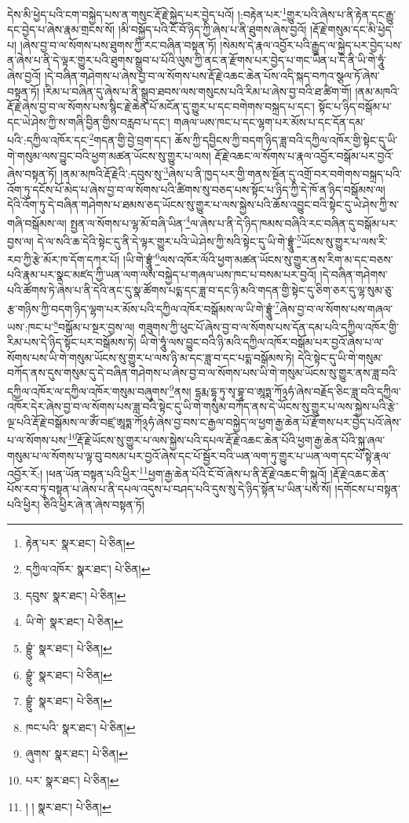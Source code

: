 དེས་མི་ཕྱེད་པའི་ངག་བསྐྱེད་པས་ན་གསུང་རྡོ་རྗེ་སྐྱེད་པར་བྱེད་པའོ། །:བརྟེན་པར་\footnote{རྟེན་པར་  སྣར་ཐང་།  པེ་ཅིན། }གྱུར་པའི་ཞེས་པ་ནི་རྟེན་དང་རྒྱུ་དང་བྱེད་པ་ཞེས་རྣམ་གྲངས་སོ། །མི་བསྐྱོད་པའི་ངོ་བོ་ཉིད་ཀྱི་ཞེས་པ་ནི་ཐུགས་ཞེས་བྱའོ། །རྡོ་རྗེ་གསུམ་དང་མི་ཕྱེད་པ། །ཞེས་བྱ་བ་ལ་སོགས་པས་ཐུགས་ཀྱི་རང་བཞིན་བསྟན་ཏོ། །སེམས་དེ་རྣལ་འབྱོར་པའི་རྒྱུད་ལ་སྐྱེད་པར་བྱེད་པས་ན་ཞེས་པ་ནི་དེ་ལྟར་གྱུར་པའི་ཐུགས་སྒྲུབ་པ་པོའི་ལུས་ཀྱི་ནང་ན་རྫོགས་པར་བྱེད་པ་གང་ཡིན་པ་དེ་ནི་ཡི་གེ་ཧཱུཾ་ཞེས་བྱའོ། །དེ་བཞིན་གཤེགས་པ་ཞེས་བྱ་བ་ལ་སོགས་པས་རྡོ་རྗེ་འཆང་ཆེན་པོས་འདི་སྐད་བཀའ་སྩལ་ཏོ་ཞེས་བསྟན་ཏོ། །རིམ་པ་བཞིན་དུ་ཞེས་པ་ནི་སྒྲུབ་ཐབས་ལས་གསུངས་པའི་རིམ་པ་ཞེས་བྱ་བའི་ཐ་ཚིག་གོ། །ནམ་མཁའི་རྡོ་རྗེ་ཞེས་བྱ་བ་ལ་སོགས་པས་སྙིང་རྗེ་ཆེན་པོ་མངོན་དུ་གྱུར་པ་དང་བགེགས་བསྐྲད་པ་དང་། སྟོང་པ་ཉིད་བསྒོམ་པ་དང་ཡེ་ཤེས་ཀྱི་ས་གཞི་བྱིན་གྱིས་བརླབ་པ་དང་། གཞལ་ཡས་ཁང་པ་དང་ལྷག་པར་མོས་པ་དང་དོན་དམ་པའི་:དཀྱིལ་འཁོར་དང་\footnote{དཀྱིལ་འཁོར་  སྣར་ཐང་།  པེ་ཅིན། }གདན་གྱི་བྱེ་བྲག་དང་། ཆོས་ཀྱི་དབྱིངས་ཀྱི་བདག་ཉིད་ཟླ་བའི་དཀྱིལ་འཁོར་གྱི་སྟེང་དུ་ཡི་གེ་གསུམ་ལས་བྱུང་བའི་ཕྱག་མཚན་ཡོངས་སུ་གྱུར་པ་ལས། རྡོ་རྗེ་འཆང་ལ་སོགས་པ་རྣལ་འབྱོར་བསྒོམ་པར་བྱའོ་ཞེས་བསྟན་ཏོ། །ནམ་མཁའི་རྡོ་རྗེའི་:དབུས་སུ་\footnote{དབུས་  སྣར་ཐང་།  པེ་ཅིན། }ཞེས་པ་ནི་ཁྱད་པར་གྱི་གནས་སྔོན་དུ་འགྲོ་བར་བགེགས་བསྐྲད་པའི་འོག་ཏུ་དངོས་པོ་མེད་པ་ཞེས་བྱ་བ་ལ་སོགས་པའི་ཚིགས་སུ་བཅད་པས་སྟོང་པ་ཉིད་ཀྱི་དེ་ཁོ་ན་ཉིད་བསྒོམས་ལ། དེའི་འོག་ཏུ་དེ་བཞིན་གཤེགས་པ་ཐམས་ཅད་ཡོངས་སུ་གྱུར་པ་ལས་སྐྱེས་པའི་ཆོས་འབྱུང་བའི་སྟེང་དུ་ཡེ་ཤེས་ཀྱི་ས་གཞི་བསྒོམས་ལ། སྤྱན་ལ་སོགས་པ་ལྷ་མོ་བཞི་ཡིན་\footnote{ཡི་གེ་  སྣར་ཐང་།  པེ་ཅིན། }ལ་ཞེས་པ་ནི་དེ་ཉིད་ཁམས་བཞིའི་རང་བཞིན་དུ་བསྒོམ་པར་བྱས་ལ། དེ་ལ་སའི་ཆ་དེའི་སྟེང་དུ་ནི་དེ་ལྟར་གྱུར་པའི་ཡེ་ཤེས་ཀྱི་སའི་སྟེང་དུ་ཡི་གེ་བྷྲཱུཾ་\footnote{བྷྲུཾ་  སྣར་ཐང་།  པེ་ཅིན། }ཡོངས་སུ་གྱུར་པ་ལས་རི་རབ་ཀྱི་རྩེ་མོར་ཁ་དོག་དཀར་པོ། །ཡི་གེ་བྷྲཱུཾ་\footnote{བྷྲུཾ་  སྣར་ཐང་།  པེ་ཅིན། }ལས་འཁོར་ལོའི་ཕྱག་མཚན་ཡོངས་སུ་གྱུར་ནས་རིག་མ་དང་བཅས་པའི་རྣམ་པར་སྣང་མཛད་ཀྱི་ཡན་ལག་ལས་བསྐྱེད་པ་གཞལ་ཡས་ཁང་པ་བསམ་པར་བྱའོ། །དེ་བཞིན་གཤེགས་པའི་ཚོགས་ཏེ་ཞེས་པ་ནི་དེའི་ནང་དུ་སྣ་ཚོགས་པདྨ་དང་ཟླ་བ་དང་ཉི་མའི་གདན་གྱི་སྟེང་དུ་ཅིག་ཅར་དུ་ལྷ་སུམ་ཅུ་རྩ་གཉིས་ཀྱི་བདག་ཉིད་ལྷག་པར་མོས་པའི་དཀྱིལ་འཁོར་བསྒོམས་ལ་ཡི་གེ་བྷྲཱུཾ་\footnote{བྷྲུཾ་  སྣར་ཐང་།  པེ་ཅིན། }ཞེས་བྱ་བ་ལ་སོགས་པས་གཞལ་ཡས་:ཁང་པ་\footnote{ཁང་པའི་  སྣར་ཐང་།  པེ་ཅིན། }བསྒོམ་པ་སྔར་བྱས་ལ། གཟུགས་ཀྱི་ཕུང་པོ་ཞེས་བྱ་བ་ལ་སོགས་པས་དོན་དམ་པའི་དཀྱིལ་འཁོར་གྱི་རིམ་པས་དེ་ཉིད་སྟོང་པར་བསྒོམས་ཏེ། ཡི་གེ་ཧཱུཾ་ལས་བྱུང་བའི་ཉི་མའི་དཀྱིལ་འཁོར་བསྒོམ་པར་བྱའོ་ཞེས་པ་ལ་སོགས་པས་ཡི་གེ་གསུམ་ཡོངས་སུ་གྱུར་པ་ལས་ཉི་མ་དང་ཟླ་བ་དང་པདྨ་བསྒོམས་ཏེ། དེའི་སྟེང་དུ་ཡི་གེ་གསུམ་བཀོད་ནས་དུས་གསུམ་དུ་དེ་བཞིན་གཤེགས་པ་ཞེས་བྱ་བ་ལ་སོགས་པས་ཡི་གེ་གསུམ་ཡོངས་སུ་གྱུར་ནས་ཟླ་བའི་དཀྱིལ་འཁོར་ལ་དཀྱིལ་འཁོར་གསུམ་བཞུགས་\footnote{ཞུགས་  སྣར་ཐང་།  པེ་ཅིན། }ནས། དྷརྨ་དྷཱ་ཏུ་སྭ་བྷཱ་བ་ཨཱཏྨ་ཀོ྅ཧཾ་ཞེས་བརྗོད་ཅིང་ཟླ་བའི་དཀྱིལ་འཁོར་དེར་ཞེས་བྱ་བ་ལ་སོགས་པས་ཟླ་བའི་སྟེང་དུ་ཡི་གེ་གསུམ་བཀོད་ནས་དེ་ཡོངས་སུ་གྱུར་པ་ལས་སྐྱེས་པའི་རྩེ་ལྔ་པའི་རྡོ་རྗེ་བསྒོམས་ལ་ཨོཾ་བཛྲ་ཨཱཏྨ་ཀོ྅ཧཾ་ཞེས་བྱ་བས་ང་རྒྱལ་བསྐྱེད་ལ་ཕྱག་རྒྱ་ཆེན་པོ་རྫོགས་པར་བྱེད་པའོ་ཞེས་པ་ལ་སོགས་པས་\footnote{པར་  སྣར་ཐང་།  པེ་ཅིན། }རྡོ་རྗེ་ཡོངས་སུ་གྱུར་པ་ལས་སྐྱེས་པའི་དཔལ་རྡོ་རྗེ་འཆང་ཆེན་པོའི་ཕྱག་རྒྱ་ཆེན་པོའི་སྐུ་ཞལ་གསུམ་པ་ལ་སོགས་པ་ལྟ་བུ་བསམ་པར་བྱའོ་ཞེས་དང་པོ་སྦྱོར་བའི་ཡན་ལག་ཏུ་གྱུར་པ་ཡན་ལག་དང་པོ་སྟེ་རྣལ་འབྱོར་རོ:། །ཕན་ཡོན་བསྟན་པའི་ཕྱིར་\footnote{། །  སྣར་ཐང་།  པེ་ཅིན། }ཕྱག་རྒྱ་ཆེན་པོའི་ངོ་བོ་ཞེས་པ་ནི་རྡོ་རྗེ་འཆང་གི་སྐུའོ། །རྡོ་རྗེ་འཆང་ཆེན་པོས་རབ་ཏུ་བསྟན་པ་ཞེས་པ་ནི་དཔལ་འདུས་པ་བཤད་པའི་དུས་སུ་དེ་ཉིད་སྟོན་པ་ཡིན་པས་སོ། །དགོངས་པ་བསྟན་པའི་ཕྱིར། ཅིའི་ཕྱིར་ཞེ་ན་ཞེས་བསྟན་ཏོ། 